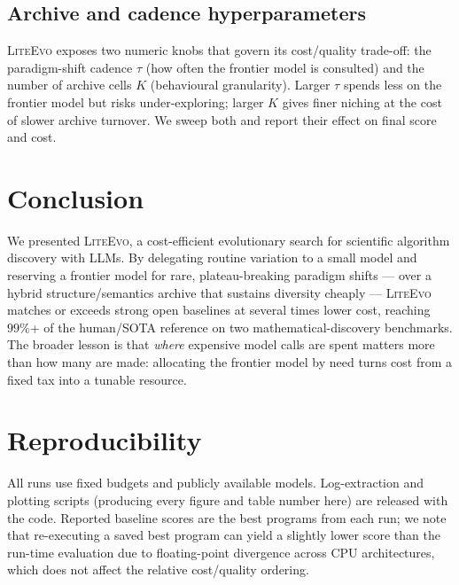 \documentclass[10pt,twocolumn]{article}
\newcommand{\liteevo}{\textsc{LiteEvo}}
\begin{document}
\subsection{Archive and cadence hyperparameters}
\liteevo{} exposes two numeric knobs that govern its cost/quality trade-off:
the paradigm-shift cadence $\tau$ (how often the frontier model is consulted)
and the number of archive cells $K$ (behavioural granularity). Larger $\tau$
spends less on the frontier model but risks under-exploring; larger $K$ gives
finer niching at the cost of slower archive turnover. We sweep both and report
their effect on final score and cost. %

\section{Conclusion}
\label{sec:conclusion}

We presented \liteevo, a cost-efficient evolutionary search for scientific
algorithm discovery with LLMs. By delegating routine variation to a small model
and reserving a frontier model for rare, plateau-breaking paradigm shifts ---
over a hybrid structure/semantics archive that sustains diversity cheaply ---
\liteevo{} matches or exceeds strong open baselines at several times lower cost,
reaching $99\%$+ of the human/SOTA reference on two mathematical-discovery
benchmarks. The broader lesson is that \emph{where} expensive model calls are
spent matters more than how many are made: allocating the frontier model by
need turns cost from a fixed tax into a tunable resource.

\section*{Reproducibility}
All runs use fixed budgets and publicly available models. Log-extraction and
plotting scripts (producing every figure and table number here) are released
with the code. Reported baseline scores are the best programs from each run;
we note that re-executing a saved best program can yield a slightly lower score
than the run-time evaluation due to floating-point divergence across CPU
architectures, which does not affect the relative cost/quality ordering.
\end{document}
